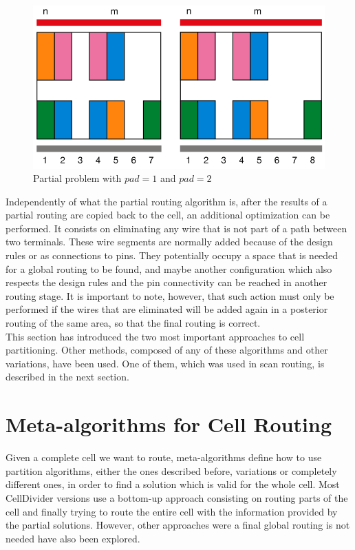 \begin{figure}[h!]
  \centering
  \includegraphics[scale=0.5]{img/design/pads.png}
  \caption{Partial problem with $pad = 1$ and $pad = 2$}
  \label{fig:pads}
\end{figure} 

Independently of what the partial routing algorithm is, after the results of a partial routing are copied back to the cell, an additional optimization can be performed. It consists on eliminating any wire that is not part of a path between two terminals. These wire segments are normally added because of the design rules or as connections to pins. They potentially occupy a space that is needed for a global routing to be found, and maybe another configuration which also respects the design rules and the pin connectivity can be reached in another routing stage. It is important to note, however, that such action must only be performed if the wires that are eliminated will be added again in a posterior routing of the same area, so that the final routing is correct. \\

This section has introduced the two most important approaches to cell partitioning. Other methods, composed of any of these algorithms and other variations, have been used. One of them, which was used in scan routing, is described in the next section. \\


\section{Meta-algorithms for Cell Routing}
\label{sec:metaalgorithms}

Given a complete cell we want to route, meta-algorithms define how to use partition algorithms, either the ones described before, variations or completely different ones, in order to find a solution which is valid for the whole cell. Most CellDivider versions use a bottom-up approach consisting on routing parts of the cell and finally trying to route the entire cell with the information provided by the partial solutions. However, other approaches were a final global routing is not needed have also been explored.  \\

